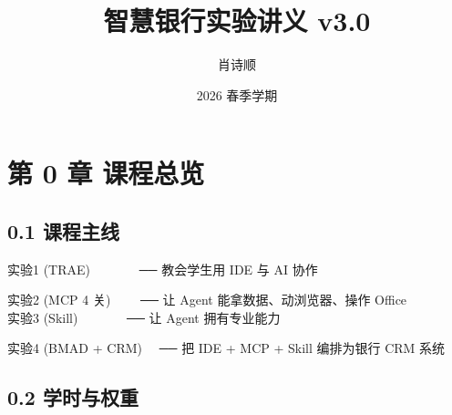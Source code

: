 \documentclass[
  american,
  chinese,
]{ctexart}
\title{智慧银行实验讲义 v3.0}
\author{肖诗顺}
\date{2026 春季学期}
\begin{document}
\maketitle

{
\setcounter{tocdepth}{3}
\tableofcontents
}


\clearpage

\section{\texorpdfstring{{第}\foreignlanguage{american}{ 0 }{章}{ }{课程总{览}}\foreignlanguage{american}{}}{第 0 章 课程总览}}\label{ux7b2c-0-ux7ae0-ux8bfeux7a0bux603bux89c8}

\subsection{\texorpdfstring{\foreignlanguage{american}{0.1 }{课程主线}\foreignlanguage{american}{}}{0.1 课程主线}}\label{ux8bfeux7a0bux4e3bux7ebf}

{实验}\foreignlanguage{american}{1 (TRAE){~~~~~~~
}── }{教会学生用}\foreignlanguage{american}{ IDE }{与}\foreignlanguage{american}{ AI }{协作}\foreignlanguage{american}{{~~~~~~~ }}

{实验}\foreignlanguage{american}{2 (MCP 4 }{关}\foreignlanguage{american}{){~~~~ }── }{让}\foreignlanguage{american}{ Agent }{能拿数据、动浏览器、操作}\foreignlanguage{american}{ Office{~~~~~~~ }}{实验}\foreignlanguage{american}{3
(Skill){~~~~~~~
}── }{让}\foreignlanguage{american}{ Agent }{拥有专业能力}\foreignlanguage{american}{{~~~~~~ }}

\foreignlanguage{american}{实验}\foreignlanguage{american}{4 (BMAD + {CRM){~~ }}── }\foreignlanguage{american}{把}\foreignlanguage{american}{ IDE + MCP + Skill }{\foreignlanguage{american}{编排为银行}}\foreignlanguage{american}{ CRM }{\foreignlanguage{american}{系统}}\foreignlanguage{american}{ }

\subsection{\texorpdfstring{\foreignlanguage{american}{0.2 }{\foreignlanguage{american}{学时与权重}}}{0.2 学时与权重}}\label{ux5b66ux65f6ux4e0eux6743ux91cd}
\end{document}
